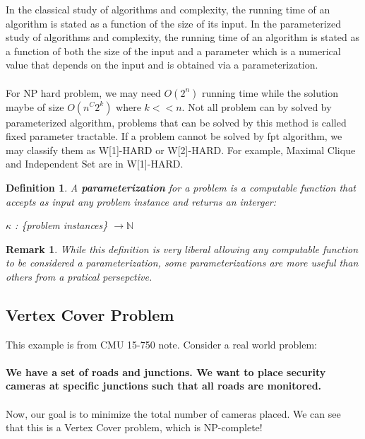 \documentclass[12pt]{article}
\newtheorem{definition}{Definition}
\newtheorem*{remark}{Remark}
\begin{document}
In the classical study of algorithms and complexity, the running time of an algorithm is stated as a function of the size of its input. In the parameterized study of algorithms and complexity, the running time of an algorithm is stated as a function of both the size of the input and a parameter which is a numerical value that depends on the input and is obtained via a parameterization.
\\
\\
For NP hard problem, we may need $O(2^n)$ running time while the solution maybe of size $O(n^C2^k)$ where $k << n$. Not all problem can by solved by parameterized algorithm, problems that can be solved by this method is called fixed parameter tractable. If a problem cannot be solved by fpt algorithm, we may classify them as W[1]-HARD or W[2]-HARD. For example, Maximal Clique and Independent Set are in W[1]-HARD.

\begin{definition}
    A \textbf{parameterization} for a problem is a computable function that accepts as input any problem instance and returns an interger:
    \begin{center}
        $\kappa$ : \{problem instances\} $\longrightarrow \mathbb{N}$
    \end{center}
\end{definition}

\begin{remark}
    While this definition is very liberal allowing any computable function to be considered a parameterization, some parameterizations are more useful than others from a pratical persepctive.
\end{remark}

\subsection{Vertex Cover Problem}

This example is from CMU 15-750 note. Consider a real world problem:
\\
\\
\textbf{We have a set of roads and junctions. We want to place security cameras at specific junctions such that all roads are monitored.}
\\
\\
Now, our goal is to minimize the total number of cameras placed. We can see that this is a Vertex Cover problem, which is NP-complete!
\end{document}
